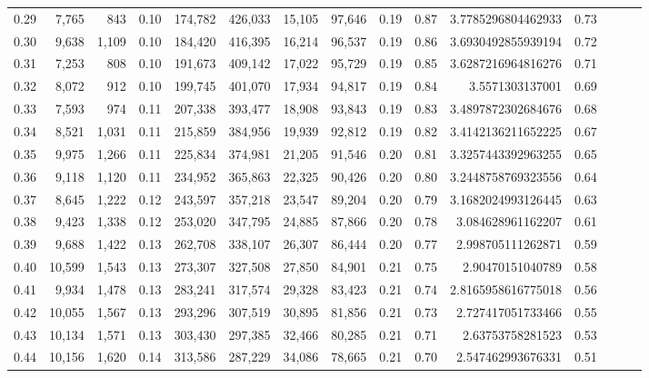 \begin{tabular}{rrrrrrrrrrrrrrr}
0.29 &   7,765 &    843 &  0.10 &  174,782 &  426,033 &   15,105 &   97,646 &  0.19 &  0.87 &    3.7785296804462933 &      0.73 \\
0.30 &   9,638 &  1,109 &  0.10 &  184,420 &  416,395 &   16,214 &   96,537 &  0.19 &  0.86 &    3.6930492855939194 &      0.72 \\
0.31 &   7,253 &    808 &  0.10 &  191,673 &  409,142 &   17,022 &   95,729 &  0.19 &  0.85 &    3.6287216964816276 &      0.71 \\
0.32 &   8,072 &    912 &  0.10 &  199,745 &  401,070 &   17,934 &   94,817 &  0.19 &  0.84 &       3.5571303137001 &      0.69 \\
0.33 &   7,593 &    974 &  0.11 &  207,338 &  393,477 &   18,908 &   93,843 &  0.19 &  0.83 &    3.4897872302684676 &      0.68 \\
0.34 &   8,521 &  1,031 &  0.11 &  215,859 &  384,956 &   19,939 &   92,812 &  0.19 &  0.82 &    3.4142136211652225 &      0.67 \\
0.35 &   9,975 &  1,266 &  0.11 &  225,834 &  374,981 &   21,205 &   91,546 &  0.20 &  0.81 &    3.3257443392963255 &      0.65 \\
0.36 &   9,118 &  1,120 &  0.11 &  234,952 &  365,863 &   22,325 &   90,426 &  0.20 &  0.80 &    3.2448758769323556 &      0.64 \\
0.37 &   8,645 &  1,222 &  0.12 &  243,597 &  357,218 &   23,547 &   89,204 &  0.20 &  0.79 &    3.1682024993126445 &      0.63 \\
0.38 &   9,423 &  1,338 &  0.12 &  253,020 &  347,795 &   24,885 &   87,866 &  0.20 &  0.78 &     3.084628961162207 &      0.61 \\
0.39 &   9,688 &  1,422 &  0.13 &  262,708 &  338,107 &   26,307 &   86,444 &  0.20 &  0.77 &     2.998705111262871 &      0.59 \\
0.40 &  10,599 &  1,543 &  0.13 &  273,307 &  327,508 &   27,850 &   84,901 &  0.21 &  0.75 &      2.90470151040789 &      0.58 \\
0.41 &   9,934 &  1,478 &  0.13 &  283,241 &  317,574 &   29,328 &   83,423 &  0.21 &  0.74 &    2.8165958616775018 &      0.56 \\
0.42 &  10,055 &  1,567 &  0.13 &  293,296 &  307,519 &   30,895 &   81,856 &  0.21 &  0.73 &     2.727417051733466 &      0.55 \\
0.43 &  10,134 &  1,571 &  0.13 &  303,430 &  297,385 &   32,466 &   80,285 &  0.21 &  0.71 &      2.63753758281523 &      0.53 \\
0.44 &  10,156 &  1,620 &  0.14 &  313,586 &  287,229 &   34,086 &   78,665 &  0.21 &  0.70 &     2.547462993676331 &      0.51 \\

\end{tabular}

